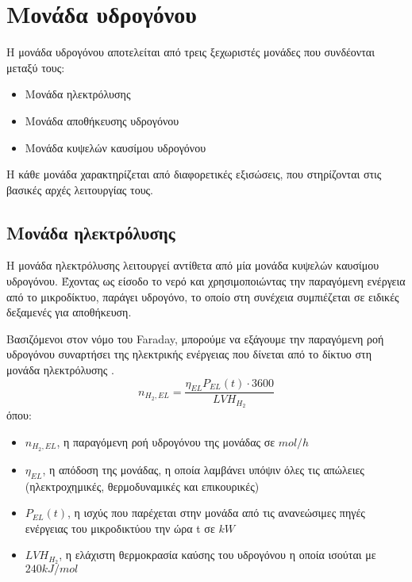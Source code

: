 \section{Μονάδα υδρογόνου}
Η μονάδα υδρογόνου αποτελείται από τρεις ξεχωριστές μονάδες που συνδέονται μεταξύ τους:
\begin{itemize}
    \item Mονάδα ηλεκτρόλυσης 
    \\
    \item Mονάδα αποθήκευσης υδρογόνου
    \\
    \item Mονάδα κυψελών καυσίμου υδρογόνου 
\end{itemize}
Η κάθε μονάδα χαρακτηρίζεται από διαφορετικές εξισώσεις, που στηρίζονται στις βασικές αρχές λειτουργίας τους. 

\subsection{Μονάδα ηλεκτρόλυσης}

Η μονάδα ηλεκτρόλυσης λειτουργεί αντίθετα από μία μονάδα κυψελών καυσίμου υδρογόνου. Έχοντας ως είσοδο το νερό και χρησιμοποιώντας την παραγόμενη ενέργεια από το μικροδίκτυο, παράγει υδρογόνο, το οποίο στη συνέχεια συμπιέζεται σε ειδικές δεξαμενές για αποθήκευση. 

Βασιζόμενοι στον νόμο του \en Faraday, \gr μπορούμε να εξάγουμε την παραγόμενη ροή υδρογόνου συναρτήσει της ηλεκτρικής ενέργειας που δίνεται από το δίκτυο στη μονάδα ηλεκτρόλυσης \cite{CAU2014820}. 
\begin{equation}
    n_{H_2,EL}=\frac{η_{EL}P_{EL}(t)\cdot3600}{LVH_{H_2}} \label{n_H2_EL}
\end{equation}
όπου:
\begin{itemize}
  \item[] $n_{H_2,EL}$, η παραγόμενη ροή υδρογόνου της μονάδας σε $mol/h$
  \\
  \item[] $η_{EL}$, η απόδοση της μονάδας, η οποία λαμβάνει υπόψιν όλες τις απώλειες (ηλεκτροχημικές, θερμοδυναμικές και επικουρικές)
  \\
  \item[] $P_{EL}(t)$, η ισχύς που παρέχεται στην μονάδα από τις ανανεώσιμες πηγές ενέργειας του μικροδικτύου την ώρα t σε $kW$
  \\
  \item[] $LVH_{H_2}$, η ελάχιστη θερμοκρασία καύσης του υδρογόνου η οποία ισούται με $240 kJ/mol$
\end{itemize}

